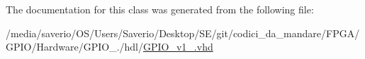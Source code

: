 The documentation for this class was generated from the following file\+:\begin{DoxyCompactItemize}
\item 
/media/saverio/\+O\+S/\+Users/\+Saverio/\+Desktop/\+S\+E/git/codici\+\_\+da\+\_\+mandare/\+F\+P\+G\+A/\+G\+P\+I\+O/\+Hardware/\+G\+P\+I\+O\+\_./hdl/\hyperlink{GPIO__v1__0_8vhd}{G\+P\+I\+O\+\_\+v1\+\_.\+vhd}\end{DoxyCompactItemize}
